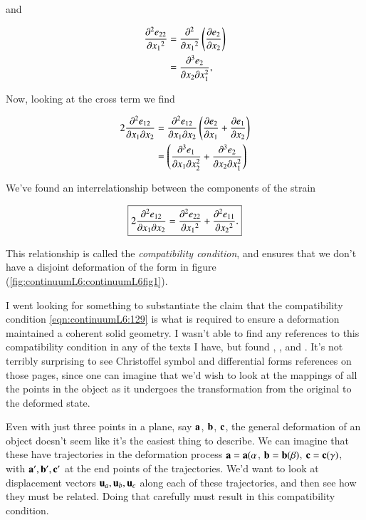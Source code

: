 and

\begin{align*}
\PDSq{x_1}{e_{22}} 
&= 
\PDSq{x_1}{}\left( 
\PD{x_2}{e_2}
\right) \\
&= 
\frac{\partial^3 e_2}{\partial x_2 \partial x_1^2},
\end{align*}

Now, looking at the cross term we find

\begin{align*}
2 \frac{\partial^2 e_{12}}{\partial x_1 \partial x_2} 
&= 
\frac{\partial^2 e_{12}}{\partial x_1 \partial x_2} 
\left(
\PD{x_1}{e_2}
+ \PD{x_2}{e_1} 
\right) \\
&=
\left(
\frac{\partial^3 e_1}{\partial x_1 \partial x_2^2} 
+
\frac{\partial^3 e_2}{\partial x_2 \partial x_1^2} 
\right)
\end{align*}

We've found an interrelationship between the components of the strain

\begin{equation}\label{eqn:continuumL6:129}
\boxed{
2 \frac{\partial^2 e_{12}}{\partial x_1 \partial x_2} 
=
\PDSq{x_1}{e_{22}} 
+\PDSq{x_2}{e_{11}}.
}
\end{equation}

This relationship is called the \textit{compatibility condition}, and ensures that we don't have a disjoint deformation of the form in figure (\ref{fig:continuumL6:continuumL6fig1}).


I went looking for something to substantiate the claim that the compatibility condition \ref{eqn:continuumL6:129} is what is required to ensure a deformation maintained a coherent solid geometry.  I wasn't able to find any references to this compatibility condition in any of the texts I have, but found \citep{wiki:compatibilityMechanics}, \citep{wiki:infinitesimalStrainTheory}, and \citep{wiki:saintVenantCompat}.  It's not terribly surprising to see Christoffel symbol and differential forms references on those pages, since one can imagine that we'd wish to look at the mappings of all the points in the object as it undergoes the transformation from the original to the deformed state.

Even with just three points in a plane, say $\Ba$, $\Bb$, $\Bc$, the general deformation of an object doesn't seem like it's the easiest thing to describe.  We can imagine that these have trajectories in the deformation process $\Ba = \Ba(\alpha$, $\Bb = \Bb(\beta)$, $\Bc = \Bc(\gamma)$, with $\Ba', \Bb', \Bc'$ at the end points of the trajectories.  We'd want to look at displacement vectors $\Bu_a, \Bu_b, \Bu_c$ along each of these trajectories, and then see how they must be related.  Doing that carefully must result in this compatibility condition.

